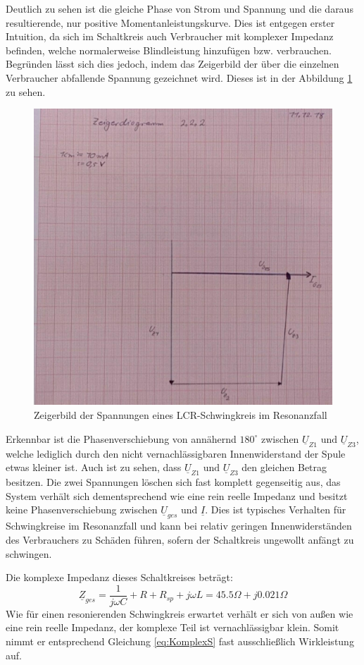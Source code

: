 Deutlich zu sehen ist die gleiche Phase von Strom und Spannung und die daraus resultierende, nur positive Momentanleistungskurve. Dies ist entgegen erster Intuition, da sich im Schaltkreis auch Verbraucher mit komplexer Impedanz befinden, welche normalerweise Blindleistung hinzufügen bzw. verbrauchen.
Begründen lässt sich dies jedoch, indem das Zeigerbild der über die einzelnen Verbraucher abfallende Spannung gezeichnet wird. Dieses ist in der Abbildung \ref{fig:ZeigerbildResonanz} zu sehen.

\begin{figure}[H]
\centering
\includegraphics[width=0.7\linewidth]{Images/Zeigerdiagramm2-2-2.jpg}
\caption{Zeigerbild der Spannungen eines LCR-Schwingkreis im Resonanzfall}
\label{fig:ZeigerbildResonanz}
\end{figure}

Erkennbar ist die Phasenverschiebung von annähernd $180^\circ$ zwischen $\underline{U}_{Z1} \mbox{ und } \underline{U}_{Z3}$, welche lediglich durch den nicht vernachlässigbaren Innenwiderstand der Spule etwas kleiner ist. Auch ist zu sehen, dass $\underline{U}_{Z1} \mbox{ und } \underline{U}_{Z3}$ den gleichen Betrag besitzen. Die zwei Spannungen löschen sich fast komplett gegenseitig aus, das System verhält sich dementsprechend wie eine rein reelle Impedanz und besitzt keine Phasenverschiebung zwischen $\underline{U}_{ges}$ und $\underline{I}$. Dies ist typisches Verhalten für Schwingkreise im Resonanzfall und kann bei relativ geringen Innenwiderständen des Verbrauchers zu Schäden führen, sofern der Schaltkreis ungewollt anfängt zu schwingen.

Die komplexe Impedanz dieses Schaltkreises beträgt:
\begin{equation}
\underline{Z}_{ges} = \frac{1}{j\omega C} + R + R_{sp} + j\omega L = 45.5\Omega + j0.021\Omega
\end{equation}
Wie für einen resonierenden Schwingkreis erwartet verhält er sich von außen wie eine rein reelle Impedanz, der komplexe Teil ist vernachlässigbar klein. Somit nimmt er entsprechend Gleichung \eqref{eq:KomplexS} fast ausschließlich Wirkleistung auf.
